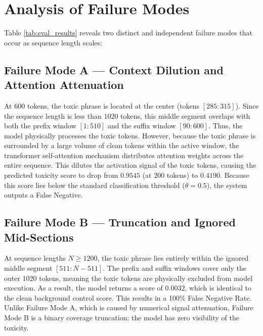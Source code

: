 \documentclass[10pt]{article}
\begin{document}
\section{Analysis of Failure Modes}
Table \ref{tab:eval_results} reveals two distinct and independent failure modes that occur as sequence length scales:

\subsection{Failure Mode A --- Context Dilution and Attention Attenuation}
At $600$ tokens, the toxic phrase is located at the center (tokens $[285:315]$). Since the sequence length is less than $1020$ tokens, this middle segment overlaps with both the prefix window $[1:510]$ and the suffix window $[90:600]$. Thus, the model physically processes the toxic tokens.
However, because the toxic phrase is surrounded by a large volume of clean tokens within the active window, the transformer self-attention mechanism distributes attention weights across the entire sequence. This dilutes the activation signal of the toxic tokens, causing the predicted toxicity score to drop from $0.9545$ (at $200$ tokens) to $0.4190$. Because this score lies below the standard classification threshold ($\theta = 0.5$), the system outputs a False Negative.

\subsection{Failure Mode B --- Truncation and Ignored Mid-Sections}
At sequence lengths $N \ge 1200$, the toxic phrase lies entirely within the ignored middle segment $[511 : N-511]$. The prefix and suffix windows cover only the outer 1020 tokens, meaning the toxic tokens are physically excluded from model execution. 
As a result, the model returns a score of $0.0032$, which is identical to the clean background control score. This results in a 100\% False Negative Rate. Unlike Failure Mode A, which is caused by numerical signal attenuation, Failure Mode B is a binary coverage truncation: the model has zero visibility of the toxicity.
\end{document}

